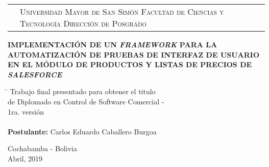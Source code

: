 \newcommand{\umsslogo}{
\adjustbox{valign=t}{}
}
\newcommand{\fcytlogo}{
\adjustbox{valign=t}{}
}

\begin{titlepage}

\begin{tabular}[t]{c p{8.6cm} c}
\umsslogo &
\vfill
\large{\textsc{Universidad Mayor de San Simón}} \newline
\large{\textsc{Facultad de Ciencias y Tecnología}} \newline
\large{\textsc{Dirección de Posgrado}} &
\fcytlogo \\
\end{tabular}
\vspace{3.5cm}
\begin{center}
\huge{\bf{IMPLEMENTACIÓN DE UN \emph{FRAMEWORK} PARA LA AUTOMATIZACIÓN DE
PRUEBAS DE INTERFAZ DE USUARIO EN EL MÓDULO DE PRODUCTOS Y LISTAS DE PRECIOS
DE \emph{SALESFORCE}}}
\end{center}
\vfill
\begin{tabbing}
\hspace{6cm}\=\+
Trabajo final presentado para obtener el titulo \\
de Diplomado en Control de Software Comercial - \\
1ra. versión\\
\\
\textbf{Postulante:} Carlos Eduardo Caballero Burgoa\\
\end{tabbing}
\begin{center}
Cochabamba - Bolivia\\
Abril, 2019
\end{center}
\end{titlepage}

